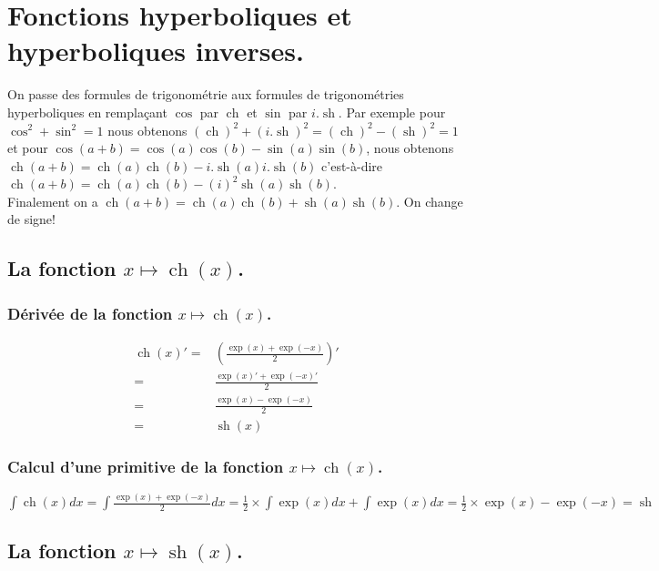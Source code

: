 \documentclass[a4paper,12pt]{report}
\renewcommand{\sinh}{\mathop{\mathrm{sh}}}
\renewcommand{\cosh}{\mathop{\mathrm{ch}}}
\begin{document}
\chapter{Fonctions hyperboliques et hyperboliques inverses.}


On passe des formules de trigonométrie aux formules de trigonométries hyperboliques en remplaçant $\cos$ par $\cosh$ et $\sin$ par $i . \sinh$. Par exemple pour $\cos^2+\sin^2=1$
nous obtenons $(\cosh)^2 + (i . \sinh)^2= (\cosh)^2 - (\sinh)^2 = 1$ et pour $\cos(a+b)=\cos(a) \cos(b) - \sin(a) \sin(b) $, nous obtenons $\cosh(a+b)=\cosh(a) \cosh(b) - i .\sinh(a) i . \sinh(b) $ c'est-à-dire $\cosh(a+b)=\cosh(a) \cosh(b) - (i)^2 \sinh(a) \sinh(b) $. \\ Finalement on a $\cosh(a+b) = \cosh(a) \cosh(b) + \sinh(a) \sinh(b) $. On change de signe!



\section{La fonction  $x \mapsto \cosh(x)$.}

\subsection{Dérivée de la fonction $x \mapsto \cosh(x)$.}
\begin{align*}
\cosh(x)' =& \left( \frac{\exp(x)+\exp(-x)}{2} \right)' \\ =& \frac{\exp(x)'+\exp(-x)'}{2} \\=& \frac{\exp(x)-\exp(-x)}{2} \\=& \sinh(x)
\end{align*}




\subsection{Calcul d'une primitive de la fonction  $x \mapsto \cosh(x)$.}

$\int \cosh(x) dx = \int \frac{\exp(x)+ \exp(-x)}{2} dx = \frac{1}{2} \times \int \exp(x) dx + \int \exp(x) dx = \frac{1}{2} \times \exp(x) - \exp(-x) = \sinh$
\\


\section{La fonction  $x \mapsto \sinh(x)$.}
\end{document}
